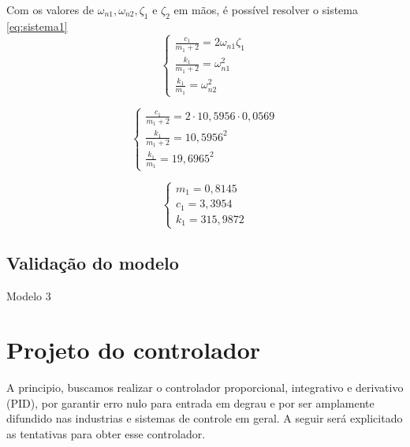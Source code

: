 \documentclass{ifacconf}
\begin{document}
Com os valores de $\omega_{n1}, \omega_{n2}, \zeta_1$ e $\zeta_2$ em mãos, é possível resolver o sistema \ref{eq:sistema1}
\begin{equation}
  \left\{
\begin{array}{lr}
  \frac{c_1}{m_1 + 2} = 2\omega_{n1} \zeta_1 \\
  \frac{k_1}{m_1 + 2} = \omega_{n1}^2 \\
  \frac{k_1}{m_1} = \omega_{n2}^2
\end{array}
\right.
\end{equation}

\begin{equation}
  \left\{
\begin{array}{lr}
  \frac{c_1}{m_1 + 2} = 2 \cdot 10,5956 \cdot 0,0569 \\
  \frac{k_1}{m_1 + 2} = 10,5956^2 \\
  \frac{k_1}{m_1} = 19,6965^2
\end{array}
\right.
\end{equation}

\begin{equation}
  \left\{
\begin{array}{lr}
  m_1 = 0,8145 \\
  c_1 = 3,3954 \\
  k_1 = 315,9872
\end{array}
\right.
\end{equation}


\subsection{Validação do modelo}

Modelo 3

\section{Projeto do controlador}

A principio, buscamos realizar o controlador proporcional, integrativo e derivativo (PID), 
por garantir erro nulo para entrada em degrau e por ser amplamente difundido nas industrias
e sistemas de controle em geral. A seguir será explicitado as tentativas para obter esse controlador.
\end{document}
